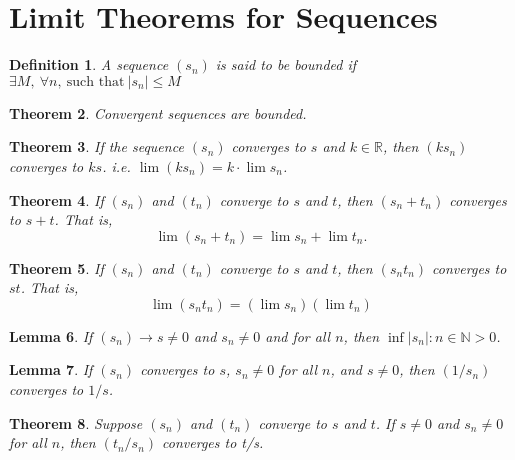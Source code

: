 \documentclass[12pt, lettersize]{book}
\newtheorem{thm}{Theorem}[section]
\newtheorem{dfn}[thm]{Definition}
\newtheorem{lem}[thm]{Lemma}
\newcommand{\N}{\mathbb{N}}
\begin{document}
	\section{Limit Theorems for Sequences}
	\begin{dfn}\label{def:bound}
		A sequence $(s_n)$ is said to be \emph{bounded} if $\exists M,\ \forall n,\ \text{such that}\ |s_n|\leq M$
	\end{dfn}
	
	\begin{thm}\label{def:convergence is bounded}
		Convergent sequences are bounded.
	\end{thm}
	
	\begin{thm}
		If the sequence $(s_n)$ converges to $s$ and $k\in\mathbb{R}$, then $(ks_n)$ converges to $ks$. i.e. $\lim(ks_n)=k\cdot\lim s_n$.
	\end{thm}
	
	\begin{thm}\label{def:addition}
		If $(s_n)$ and $(t_n)$ converge to $s$ and $t$, then $(s_n+t_n)$ converges to $s+t$. That is,
		\begin{displaymath}
			\lim(s_n+t_n)=\lim s_n+\lim t_n.
		\end{displaymath} 
	\end{thm}
	
	\begin{thm}\label{def:multiplication}
		If $(s_n)$ and $(t_n)$ converge to $s$ and $t$, then $(s_nt_n)$ converges to $st$. That is,
		\begin{displaymath}
			\lim(s_nt_n)=(\lim s_n)(\lim t_n)
		\end{displaymath} 
	\end{thm}
	
	\begin{lem}
		If $(s_n)\rightarrow s\neq0$ and $s_n\neq0$ and  for all $n$, then $\inf{|s_n|: n\in\N}>0$.
	\end{lem}
	
	\begin{lem}\label{def:reciprocal}
		If $(s_n)$ converges to $s$, $s_n\neq 0$ for all $n$, and $s\neq 0$, then $(1/s_n)$ converges to $1/s$.
	\end{lem}
	
	
	\begin{thm}
		Suppose $(s_n)$ and $(t_n)$ converge to $s$ and $t$. If $s\neq 0$ and $s_n\neq 0$ for all $n$, then $(t_n/s_n)$ converges to t/s.
	\end{thm}
	
\end{document}
